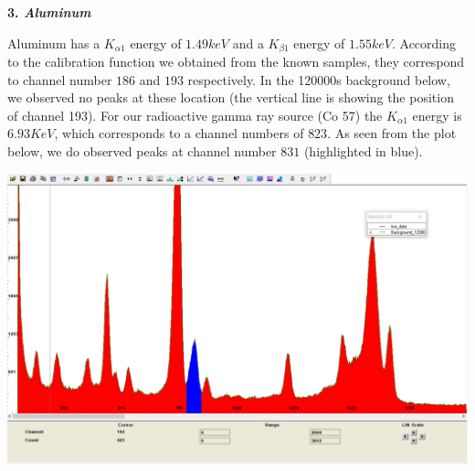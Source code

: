 \documentclass[12pt]{article}
\begin{document}
\textbf{3. \textit{Aluminum}}
\smallskip

Aluminum has a $K_{\alpha1}$ energy of $1.49keV$ and a $K_{\beta1}$ energy of $1.55keV$. According to the calibration function we obtained from the known samples, they correspond to channel number $186$ and $193$ respectively. In the 120000s background below, we observed no peaks at these location (the vertical line is showing the position of channel 193). For our radioactive gamma ray source (Co 57) the $K_{\alpha1}$ energy is $6.93KeV$, which corresponds to a channel numbers of $823$. As seen from the plot below, we do observed peaks at channel number $831$ (highlighted in blue).

\begin{center}
\includegraphics[width=15cm]{background}
\end{center}
\end{document}

